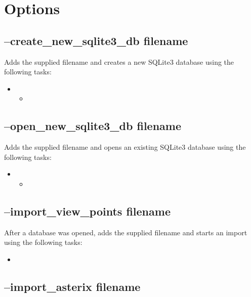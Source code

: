 \section{Options}

\subsection{--create\_new\_sqlite3\_db filename}

Adds the supplied filename and creates a new SQLite3 database using the following tasks:

\begin{itemize}
\item {}
\begin{itemize}
 \item {}
 \end{itemize}
 \end{itemize}
 
\subsection{--open\_new\_sqlite3\_db filename}

Adds the supplied filename and opens an existing SQLite3 database using the following tasks:

\begin{itemize}
\item {}
\begin{itemize}
 \item {}
 \end{itemize}
 \end{itemize}

 \subsection{--import\_view\_points filename}

After a database was opened, adds the supplied filename and starts an import using the following tasks:

\begin{itemize}
 \item {}
\end{itemize}

 
\subsection{--import\_asterix filename}

